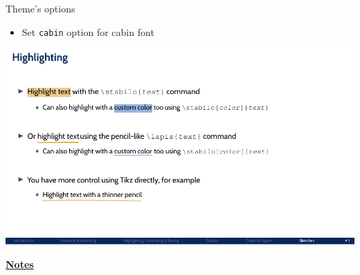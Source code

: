 \documentclass[10pt]{beamer}
\begin{document}
\begin{frame}
    {Theme's options}
    \begin{itemize}
        \item Set \texttt{cabin} option for cabin font
    \end{itemize}
    \begin{center}
        \begin{minipage}[b]{.6\textwidth}
            \includegraphics[width=\textwidth]{cabin}
        \end{minipage}
    \end{center}
\end{frame}
\begin{flushleft}
    \underline{\textbf{Notes}}\setlength{\parskip}{.15cm}\notesize\newline\par
\end{flushleft}
\end{document}
